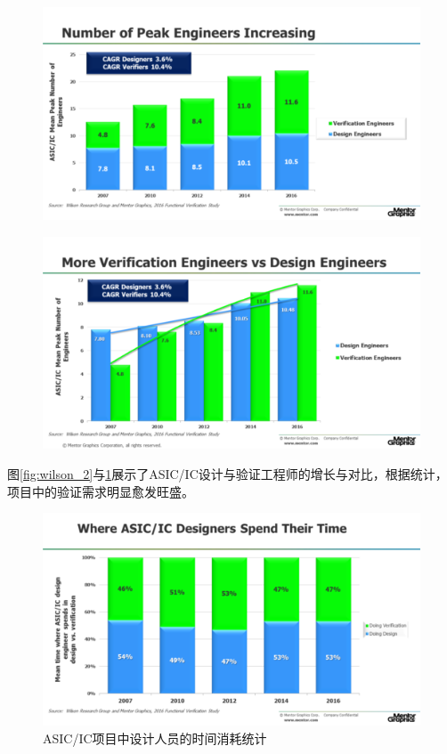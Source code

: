 \documentclass[a4paper,11pt]{article}
\begin{document}
\begin{figure}
\centering
\begin{minipage}[t]{.5\textwidth}
  \centering
  \includegraphics[width=0.95\linewidth]{images/wilson2.png}
  \label{fig:wilson_2}
\end{minipage}%
\begin{minipage}[t]{.5\textwidth}
  \centering
  \includegraphics[width=0.95\linewidth]{images/wilson3.png}
  \label{fig:wilson_3}
\end{minipage}
\end{figure}

图\ref{fig:wilson_2}与\ref{fig:wilson_3}展示了ASIC/IC设计与验证工程师的增长与对比，根据统计，项目中的验证需求明显愈发旺盛。

\begin{figure}[ht]
  \centering
  \includegraphics[width=0.8\linewidth]{images/wilson4.png}
  \caption{ASIC/IC项目中设计人员的时间消耗统计}
  \label{fig:wilson_4}
\end{figure}
\end{document}
